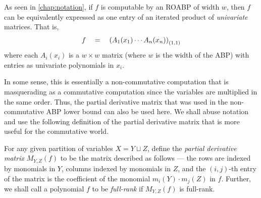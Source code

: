 As seen in \autoref{chap:notation}, if $f$ is computable by an ROABP of width $w$,  then $f$ can be equivalently expressed as one entry of an iterated product of \emph{univariate} matrices.
That is,
\[
f \quad = \quad \left(A_{1}(x_1) \cdots A_n(x_n)\right)_{(1,1)}
\]
where each $A_i(x_i)$ is a $w\times w$ matrix (where $w$ is the width of the ABP) with entries as univariate polynomials in $x_i$. 

In some sense, this is essentially a non-commutative computation that is masquerading as a commutative computation since the variables are multiplied in the same order.
Thus, the partial derivative matrix that was used in the non-commutative ABP lower bound can also be used here.
We shall abuse notation and use the following definition of the partial derivative matrix that is more useful for the commutative world.

\begin{definition} \label{defn:pdm-commutative}
For any given partition of variables $X = Y \sqcup Z$, define the \emph{partial derivative matrix} $M_{Y,Z}(f)$ to be the matrix described as follows --- the rows are indexed by monomials in $Y$, columns indexed by monomials in $Z$, and the $(i,j)$-th entry of the matrix is the coefficient of the monomial $m_i(Y)\cdot m_j(Z)$ in $f$. 
Further, we shall call a polynomial $f$ to be \emph{full-rank} if $M_{Y,Z}(f)$ is full-rank.
\end{definition}


\medskip

